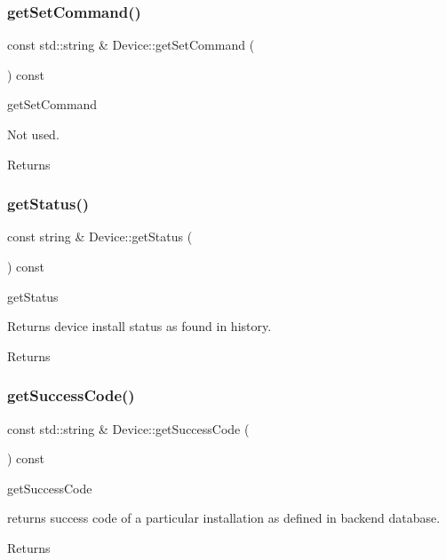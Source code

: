 \subsubsection{\texorpdfstring{get\+Set\+Command()}{getSetCommand()}}
{\footnotesize\ttfamily const std\+::string \& Device\+::get\+Set\+Command (\begin{DoxyParamCaption}{ }\end{DoxyParamCaption}) const}



get\+Set\+Command 

Not used. \begin{DoxyReturn}{Returns}

\end{DoxyReturn}
\mbox{\label{classDevice_ad49afa64f231ac899736cc21027766f2}} 
\subsubsection{\texorpdfstring{get\+Status()}{getStatus()}}
{\footnotesize\ttfamily const string \& Device\+::get\+Status (\begin{DoxyParamCaption}{ }\end{DoxyParamCaption}) const}



get\+Status 

Returns device install status as found in history. \begin{DoxyReturn}{Returns}

\end{DoxyReturn}
\mbox{\label{classDevice_a19c62e8fa746efc12e6c0521b690bf03}} 
\subsubsection{\texorpdfstring{get\+Success\+Code()}{getSuccessCode()}}
{\footnotesize\ttfamily const std\+::string \& Device\+::get\+Success\+Code (\begin{DoxyParamCaption}{ }\end{DoxyParamCaption}) const}



get\+Success\+Code 

returns success code of a particular installation as defined in backend database. \begin{DoxyReturn}{Returns}

\end{DoxyReturn}
\mbox{\label{classDevice_abbf7d73cde4dc08996414956fc25188d}} 
